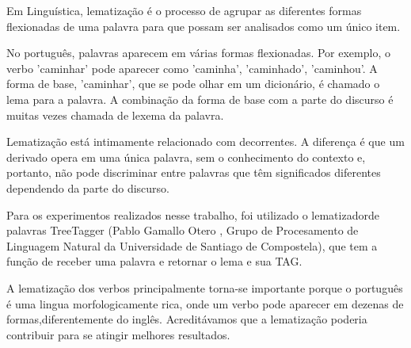 Em Linguística, lematização é o processo de agrupar as diferentes formas flexionadas de uma palavra para que possam ser analisados como um único item.

No português, palavras aparecem em várias formas flexionadas. Por exemplo, o verbo 'caminhar' pode aparecer como 'caminha', 'caminhado', 'caminhou'. A forma de base, 'caminhar', que se pode olhar em um dicionário, é chamado o lema para a palavra. A combinação da forma de base com a parte do discurso é muitas vezes chamada de lexema da palavra.

Lematização está intimamente relacionado com decorrentes. A diferença é que um derivado opera em uma única palavra, sem o conhecimento do contexto e, portanto, não pode discriminar entre palavras que têm significados diferentes dependendo da parte do discurso.

Para os experimentos realizados nesse trabalho, foi utilizado o lematizadorde palavras TreeTagger (Pablo Gamallo Otero , Grupo de Procesamento de Linguagem Natural da Universidade de Santiago de Compostela), que tem a função de receber uma palavra e retornar o lema e sua TAG.

A lematização dos verbos principalmente torna-se importante porque o português é uma lingua morfologicamente rica, onde um verbo pode aparecer em dezenas de formas,diferentemente do inglês. Acreditávamos que a lematização poderia contribuir para se atingir melhores resultados.





